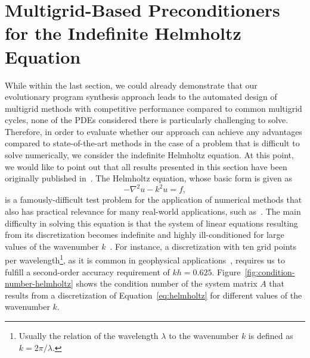 \section{Multigrid-Based Preconditioners for the Indefinite Helmholtz Equation}
While within the last section, we could already demonstrate that our evolutionary program synthesis approach leads to the automated design of multigrid methods with competitive performance compared to common multigrid cycles, none of the PDEs considered there is particularly challenging to solve.   
Therefore, in order to evaluate whether our approach can achieve any advantages compared to state-of-the-art methods in the case of a problem that is difficult to solve numerically, we consider the indefinite Helmholtz equation.
At this point, we would like to point out that all results presented in this section have been originally published in~\cite{schmitt2022evolving}.
The Helmholtz equation, whose basic form is given as 
\begin{equation}
	-\nabla ^{2}u - k^{2}u = f,
	\label{eq:helmholtz}
\end{equation} 
is a famously-difficult test problem for the application of numerical methods that also has practical relevance for many real-world applications, such as~\cite{versteeg1994marmousi,martin2006marmousi2,billette20052004,gray1995migration}.
The main difficulty in solving this equation is that the system of linear equations resulting from its discretization becomes indefinite and highly ill-conditioned for large values of the wavenumber $k$~\cite{ernst2012difficult}.
For instance, a discretization with ten grid points per wavelength\footnote{Usually the relation of the wavelength $\lambda$ to the wavenumber $k$ is defined as $k = 2 \pi/\lambda$.}, as it is common in geophysical applications~\cite{erlangga2006multigrid}, requires us to fulfill a second-order accuracy requirement of $kh = 0.625$.
Figure~\ref{fig:condition-number-helmholtz} shows the condition number of the system matrix $A$ that results from a discretization of Equation~\eqref{eq:helmholtz} for different values of the wavenumber $k$.
